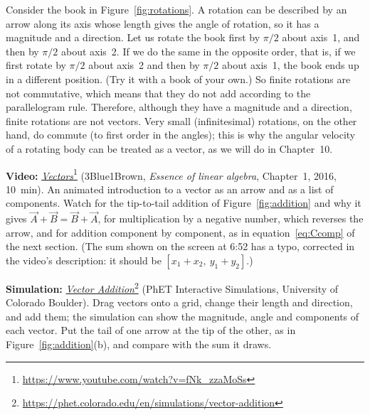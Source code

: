 \documentclass[11pt,a4paper]{article}
\begin{document}
Consider the book in Figure~\ref{fig:rotations}. A rotation can be described by an
arrow along its axis whose length gives the angle of rotation, so it has a magnitude and a
direction. Let us rotate the book first by $\pi/2$ about axis~1, and then by $\pi/2$ about
axis~2. If we do the same in the opposite order, that is, if we first rotate by $\pi/2$ about
axis~2 and then by $\pi/2$ about axis~1, the book ends up in a different position. (Try it with a
book of your own.) So finite rotations are not commutative, which means that they do not add
according to the parallelogram rule. Therefore, although they have a magnitude and a direction,
finite rotations are not vectors. Very small (infinitesimal) rotations, on the other hand, do
commute (to first order in the angles); this is why the angular velocity of a rotating body can be treated as a vector, as we
will do in Chapter~10.

\begin{aside}
\textbf{Video:}
\href{https://www.youtube.com/watch?v=fNk_zzaMoSs}{\emph{Vectors}}\footnote{\url{https://www.youtube.com/watch?v=fNk_zzaMoSs}}
(3Blue1Brown, \emph{Essence of linear algebra}, Chapter~1, 2016, 10~min). An animated
introduction to a vector as an arrow and as a list of components. Watch for the tip-to-tail
addition of Figure~\ref{fig:addition} and why it gives $\vec{A}+\vec{B} = \vec{B}+\vec{A}$, for
multiplication by a negative number, which reverses the arrow, and for addition component by
component, as in equation~\eqref{eq:Ccomp} of the next section. (The sum shown on the screen at
6:52 has a typo, corrected in the video's description: it should be $[x_1+x_2,\ y_1+y_2]$.)

\smallskip
\textbf{Simulation:}
\href{https://phet.colorado.edu/en/simulations/vector-addition}{\emph{Vector
Addition}}\footnote{\url{https://phet.colorado.edu/en/simulations/vector-addition}} (PhET
Interactive Simulations, University of Colorado Boulder). Drag vectors onto a grid, change their
length and direction, and add them; the simulation can show the magnitude, angle and components of
each vector. Put the tail of one arrow at the tip of the other, as in
Figure~\ref{fig:addition}(b), and compare with the sum it draws.
\end{aside}
\end{document}

